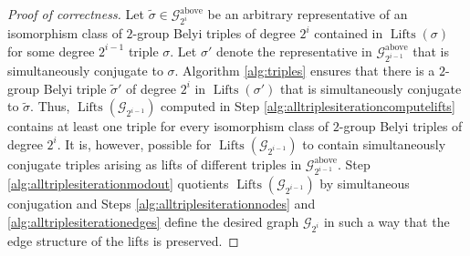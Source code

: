 \documentclass{dcthesis}
\newcommand{\wt}[1]{\widetilde{#1}}
\DeclareMathOperator{\Lifts}{Lifts}
\numberwithin{equation}{section}
\theoremstyle{definition}
\newtheorem{alg}[equation]{Algorithm}
\theoremstyle{remark}
\begin{document}
{{\begin{proof}[Proof of correctness]
      Let
      $\wt{\sigma}\in\mathscr{G}_{2^i}^\text{above}$
      be an arbitrary representative
      of an isomorphism class of
      $2$-group Belyi triples of degree $2^i$
      contained in $\Lifts(\sigma)$
      for some degree $2^{i-1}$ triple $\sigma$.
      Let $\sigma'$ denote the representative
      in $\mathscr{G}_{2^{i-1}}^\text{above}$
      that is simultaneously conjugate to
      $\sigma$.
      Algorithm \ref{alg:triples}
      ensures that there is a
      $2$-group Belyi triple $\wt{\sigma}'$
      of degree $2^i$ in
      $\Lifts(\sigma')$
      that is simultaneously conjugate
      to $\wt{\sigma}$.
      Thus,
      $\Lifts(\mathscr{G}_{2^{i-1}})$
      computed in Step
      \ref{alg:alltriplesiterationcomputelifts}
      contains at least one 
      triple for every
      isomorphism class of $2$-group
      Belyi triples of degree $2^i$.
      It is,
      however,
      possible for
      $\Lifts(\mathscr{G}_{2^{i-1}})$
      to contain simultaneously conjugate
      triples arising as lifts of
      different triples in
      $\mathscr{G}_{2^{i-1}}^\text{above}$.
      Step
      \ref{alg:alltriplesiterationmodout}
      quotients
      $\Lifts(\mathscr{G}_{2^{i-1}})$
      by simultaneous conjugation
      and
      Steps
      \ref{alg:alltriplesiterationnodes}
      and
      \ref{alg:alltriplesiterationedges}
      define the desired graph
      $\mathscr{G}_{2^i}$ in such a way
      that the edge structure of the lifts
      is preserved.
    \end{proof}
}}
\end{document}
